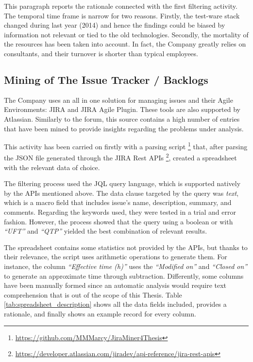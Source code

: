 This paragraph reports the rationale connected with the first filtering activity. The temporal time frame is narrow for two reasons. Firstly, the test-ware stack changed during last year (2014) and hence the findings could be biased by information not relevant or tied to the old technologies. Secondly, the mortality of the resources has been taken into account. In fact, the Company greatly relies on consultants, and their turnover is shorter than typical employees. 

\subsection{Mining of The Issue Tracker / Backlogs} \label{mining_issue_tracker}
The Company uses an all in one solution for managing issues and their Agile Environments: JIRA and JIRA Agile Plugin. These tools are also supported by Atlassian. Similarly to the forum, this source contains a high number of entries that have been mined to provide insights regarding the problems under analysis.

This activity has been carried on firstly with a parsing script \footnote{\href{https://github.com/MMMarcy/JiraMiner4Thesis}{https://github.com/MMMarcy/JiraMiner4Thesis}} that, after parsing the JSON file generated through the JIRA Rest APIs \footnote{\href{https://developer.atlassian.com/jiradev/api-reference/jira-rest-apis}{https://developer.atlassian.com/jiradev/api-reference/jira-rest-apis}}, created a spreadsheet with the relevant data of choice.


The filtering process used the JQL query language, which is supported natively by the APIs mentioned above. The data clause targeted by the query was \textit{text}, which is a macro field that includes issue's name, description, summary, and comments. Regarding the keywords used, they were tested in a trial  and error fashion. However, the process showed that the query using a boolean or with \textit{``UFT''} and \textit{``QTP''} yielded the best combination of relevant results.

The spreadsheet contains some statistics not provided by the APIs, but thanks to their relevance, the script uses arithmetic operations to generate them. For instance, the column \textit{``Effective time (h)''} uses the \textit{``Modified on''} and \textit{``Closed on''} to generate an approximate time through subtraction. Differently, some columns have been manually formed since an automatic analysis would require text comprehension that is out of the scope of this Thesis. Table \ref{tab:spreadsheet_description} shows all the data fields included, provides a rationale, and finally shows an example record for every column.




